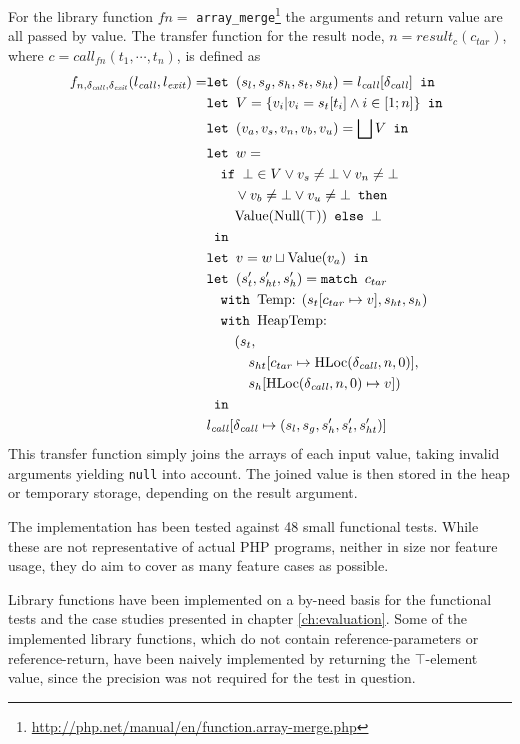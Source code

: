 For the library function $fn = $ \texttt{array\_merge}\footnote{\url{http://php.net/manual/en/function.array-merge.php}} the arguments and return value are all passed by value. The transfer function for the result node, $n = \mathit{result}_{c}(c_{\mathit{tar}})$, where $c = \mathit{call}_{{fn}}(t_1,\cdots, t_n)$, is defined as 
\begin{align*}
f_{n,\delta_{\mathit{call}},\delta_{\mathit{exit}}}(l_{\mathit{call}}, l_{\mathit{exit}}) = 	&\texttt{let } (s_l, s_g, s_h, s_t, s_{ht}) = l_{\mathit{call}}[\delta_{\mathit{call}}] \texttt{ in }\notag\\
																							&\texttt{let } V =  \{v_i| v_i = s_t[t_i]\wedge i \in [1;n]\} \texttt{ in }\notag\\
																							&\texttt{let } (v_a,v_s, v_n, v_b, v_u) = \bigsqcup V \texttt{ in }\notag\\
																							&\texttt{let } w =  \notag\\
																							&\quad\texttt{if }\bot \in V \vee v_s \neq \bot \vee v_n \neq \bot\notag\\
																							&\quad\quad \vee v_b \neq \bot \vee v_u \neq \bot\texttt{ then } \notag\\
																							&\quad\quad\text{Value}(\text{Null}(\top)) \texttt{ else } \bot\notag\\
																							& \texttt{ in }\notag\\
																							&\texttt{let } v = w \sqcup \text{Value}(v_a) \texttt{ in }\notag\\
																							&\texttt{let } (s_t', s_{ht}',s_h') = \texttt{match }c_{tar}\notag\\
																							&\quad\texttt{with }\text{Temp}\text{: } (s_t[c_{tar}\mapsto v], s_{ht}, s_h)\notag\\
																							&\quad\texttt{with }\text{HeapTemp}\text{: }\notag\\
																							&\quad\quad(s_t, \notag\\
																							&\quad\quad\quad s_{ht}[c_{tar}\mapsto \text{HLoc}(\delta_{\mathit{call}}, n, 0)], \notag\\
																							&\quad\quad\quad s_h[\text{HLoc}(\delta_{\mathit{call}}, n, 0)\mapsto v])\notag\\
																							& \texttt{ in }\notag\\
																							&l_{\mathit{call}}[\delta_{\mathit{call}}\mapsto (s_l, s_g, s_h', s_t', s_{ht}')]
\end{align*} 
This transfer function simply joins the arrays of each input value, taking invalid arguments yielding \texttt{null} into account. The joined value is then stored in the heap or temporary storage, depending on the result argument.

The implementation has been tested against 48 small functional tests. While these are not representative of actual PHP programs, neither in size nor feature usage, they do aim to cover as many feature cases as possible.

Library functions have been implemented on a by-need basis for the functional tests and the case studies presented in chapter \ref{ch:evaluation}. Some of the implemented library functions, which do not contain reference-parameters or reference-return, have been naively implemented by returning the $\top$-element value, since the precision was not required for the test in question.
